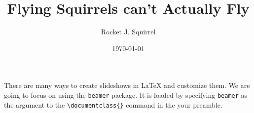 There are many ways to create slideshows in \LaTeX{} and customize them. We are going to focus on using the \texttt{beamer} package. It is loaded by specifying \texttt{beamer} as the argument to the \verb|\documentclass{}| command in the your preamble.
\author{Rocket J. Squirrel}
\institute{Moose Institute for Toetapping}
\title{Flying Squirrels can’t Actually Fly}
\date{\today}
\begin{document}
\frame{\maketitle}
\end{document}
